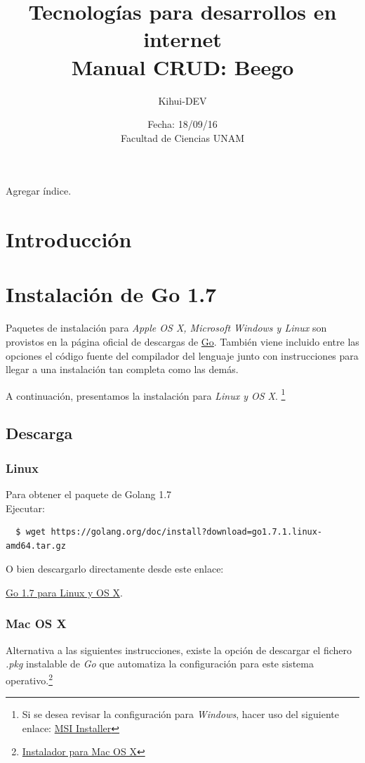 \documentclass[12pt]{article}
\title{Tecnologías para desarrollos en internet \\ Manual CRUD: Beego}
\author{Kihui-DEV}
\date{Fecha: 18/09/16 \\ Facultad de Ciencias UNAM}
\begin{document}
\maketitle
Agregar índice.
\section*{Introducción}
\section*{Instalación de Go 1.7}
Paquetes de instalación para \textit{Apple OS X, Microsoft Windows y Linux} son provistos en la página oficial de descargas de \href{https://golang.org/dl/}{Go}. También viene incluido entre las opciones el código fuente del compilador del lenguaje junto con instrucciones para llegar a una instalación tan completa como las demás. \par
A continuación, presentamos la instalación para \textit{Linux y OS X}. \footnote{Si se desea revisar la configuración para \textit{Windows}, hacer uso del siguiente enlace:
  \href{https://golang.org/doc/install?download=go1.7.1.windows-amd64.msi}{MSI Installer}}

\subsection*{Descarga}


\subsubsection*{Linux}
Para obtener el paquete de Golang 1.7 \\
Ejecutar:
\begin{verbatim}
  $ wget https://golang.org/doc/install?download=go1.7.1.linux-amd64.tar.gz
\end{verbatim}
O bien descargarlo directamente desde este enlace:
\begin{center}
\href{https://golang.org/doc/install?download=go1.7.1.linux-amd64.tar.gz}{Go 1.7 para Linux y OS X}.
\end{center}


\subsubsection*{Mac OS X}
Alternativa a las siguientes instrucciones, existe la opción de descargar el fichero \textit{.pkg} instalable de \textit{Go} que automatiza la configuración para este sistema operativo.\footnote{\href{https://golang.org/doc/install?download=go1.7.1.darwin-amd64.pkg}{Instalador para Mac OS X}}\\[1mm]
\end{document}
